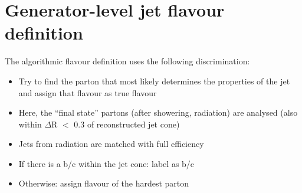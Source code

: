 \FloatBarrier
\section{Generator-level jet flavour definition}
\label{res:app:FlavorDefinition}

The algorithmic flavour definition uses the following discrimination:

\begin{itemize}
\item Try to find the parton that most likely determines the properties of the jet and assign that flavour as true flavour
\item Here, the ``final state'' partons (after showering, radiation) are analysed (also within $\Delta$R $<$ 0.3 of reconstructed jet cone)
\item Jets from radiation are matched with full efficiency
\item If there is a b/c within the jet cone: label as b/c
\item Otherwise: assign flavour of the hardest parton 
\end{itemize}

 
\FloatBarrier
